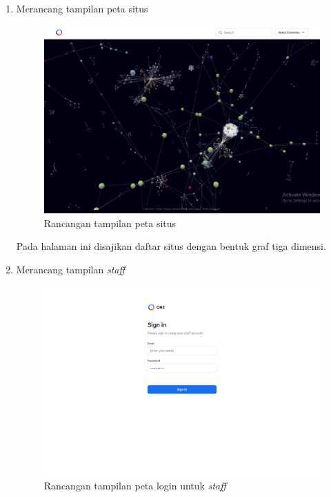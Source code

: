 \begin{enumerate}[label=\alph*)., leftmargin=1\parindent]
	\item{Merancang tampilan peta situs}
	\begin{figure}[H]
		\centering
		\includegraphics[keepaspectratio, width=15cm]{gambar/uiux_sitemap.png}
		\caption{Rancangan tampilan peta situs}
		\label{gambar:uiux_sitemap.png}
	\end{figure}


	Pada halaman ini disajikan daftar situs dengan bentuk graf tiga dimensi.
	
	\item{Merancang tampilan \textit{staff}}
	\begin{figure}[H]
		\centering
		\includegraphics[keepaspectratio, width=13cm]{gambar/uiux_staff_login.png}
		\caption{Rancangan tampilan peta login untuk \textit{staff}}
		\label{gambar:uiux_staff_login.png}
	\end{figure}


\end{enumerate}
